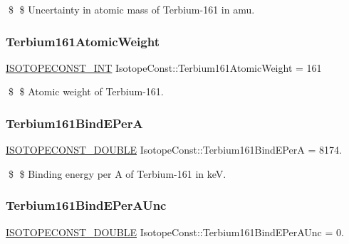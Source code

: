 \$ \$ Uncertainty in atomic mass of Terbium-\/161 in amu. \mbox{\label{group___isotope_const-_terbium-_tb161_ga8797937c38d77882d36257a4cd5a82dd}} 
\subsubsection{\texorpdfstring{Terbium161\+Atomic\+Weight}{Terbium161AtomicWeight}}
{\footnotesize\ttfamily \mbox{\hyperlink{group___isotope_const-_macros_ga5f18360b3e99483a35c32d789e62621c}{I\+S\+O\+T\+O\+P\+E\+C\+O\+N\+S\+T\+\_\+\+I\+NT}} Isotope\+Const\+::\+Terbium161\+Atomic\+Weight = 161}

\$ \$ Atomic weight of Terbium-\/161. \mbox{\label{group___isotope_const-_terbium-_tb161_gafec99aecbc431defc64ef43046da51a9}} 
\subsubsection{\texorpdfstring{Terbium161\+Bind\+E\+PerA}{Terbium161BindEPerA}}
{\footnotesize\ttfamily \mbox{\hyperlink{group___isotope_const-_macros_ga8f45a7272ce02c0b4c65c44636ed719a}{I\+S\+O\+T\+O\+P\+E\+C\+O\+N\+S\+T\+\_\+\+D\+O\+U\+B\+LE}} Isotope\+Const\+::\+Terbium161\+Bind\+E\+PerA = 8174.}

\$ \$ Binding energy per A of Terbium-\/161 in keV. \mbox{\label{group___isotope_const-_terbium-_tb161_ga01f44af01edd35eca4c45d88cdb9fe5a}} 
\subsubsection{\texorpdfstring{Terbium161\+Bind\+E\+Per\+A\+Unc}{Terbium161BindEPerAUnc}}
{\footnotesize\ttfamily \mbox{\hyperlink{group___isotope_const-_macros_ga8f45a7272ce02c0b4c65c44636ed719a}{I\+S\+O\+T\+O\+P\+E\+C\+O\+N\+S\+T\+\_\+\+D\+O\+U\+B\+LE}} Isotope\+Const\+::\+Terbium161\+Bind\+E\+Per\+A\+Unc = 0.}

